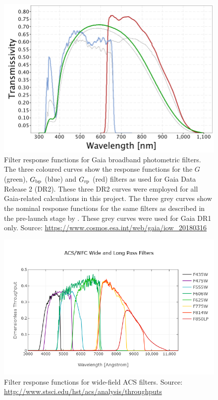 \documentclass[12pt, a4paper]{report}
\begin{document}
\begin{figure}[h!]
\begin{center}
\includegraphics[width=1.0\textwidth]{GaiaDR2Passbands.png}
\caption{Filter response functions for Gaia broadband photometric filters. The three coloured curves show the response functions for the $G$ (green), $G_{\textnormal{bp}}$ (blue) and $G_{\textnormal{rp}}$ (red) filters as used for Gaia Data Release 2 (DR2). These three DR2 curves were employed for all Gaia-related calculations in this project. The three grey curves show the nominal response functions for the same filters as described in the pre-launch stage by \cite{2010A&A...523A..48J}. These grey curves were used for Gaia DR1 only. Source: \protect\url{https://www.cosmos.esa.int/web/gaia/iow_20180316}}
\label{Gaia_response_funcs}
\end{center}
\end{figure}

\begin{figure}[h!]
\begin{center}
\includegraphics[width=1.0\textwidth]{ACS_Wide.png}
\caption{Filter response functions for wide-field ACS filters. Source: \protect\url{http://www.stsci.edu/hst/acs/analysis/throughputs}}
\label{ACS_response_funcs}
\end{center}
\end{figure}
\end{document}
